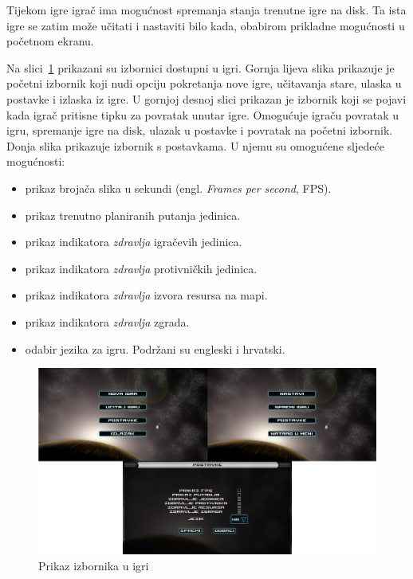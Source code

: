 \documentclass[times, utf8, zavrsni, numeric]{fer}
\begin{document}
\par Tijekom igre igrač ima mogućnost spremanja stanja trenutne igre na disk.
Ta ista igre se zatim može učitati i nastaviti bilo kada, obabirom prikladne mogućnosti u početnom ekranu.

\par Na slici~\ref{fig:menus} prikazani su izbornici dostupni u igri.
Gornja lijeva slika prikazuje je početni izbornik koji nudi opciju pokretanja nove igre, učitavanja stare, ulaska u postavke i izlaska iz igre.
U gornjoj desnoj slici prikazan je izbornik koji se pojavi kada igrač pritisne tipku za povratak unutar igre.
Omogućuje igraču povratak u igru, spremanje igre na disk, ulazak u postavke i povratak na početni izbornik.
Donja slika prikazuje izbornik s postavkama.
U njemu su omogućene sljedeće mogućnosti:
\begin{itemize}
	\item prikaz brojača slika u sekundi (engl. \textit{Frames per second}, FPS).
	\item prikaz trenutno planiranih putanja jedinica.
	\item prikaz indikatora \textit{zdravlja} igračevih jedinica.
	\item prikaz indikatora \textit{zdravlja} protivničkih jedinica.
	\item prikaz indikatora \textit{zdravlja} izvora resursa na mapi.
	\item prikaz indikatora \textit{zdravlja} zgrada.
	\item odabir jezika za igru. Podržani su engleski i hrvatski.
\end{itemize}

\begin{figure}[h]
	\centering
	\includegraphics[width=1.0\linewidth]{images/menus.png}
	\caption{Prikaz izbornika u igri}
	\label{fig:menus}
\end{figure}
\end{document}

